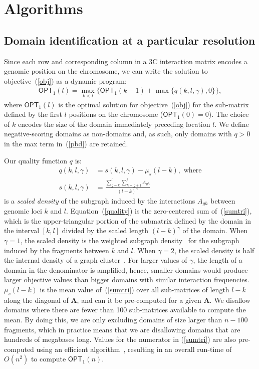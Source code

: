 \documentclass[12pt]{cmuthesis}
\begin{document}
\section{Algorithms}



  \subsection{Domain identification at a particular resolution}
  \label{singleres}
  Since each row and corresponding column in a 3C interaction matrix encodes a genomic position on the chromosome, we can write the solution to objective~(\ref{obj}) as a dynamic program:
  \begin{align}
    \label{pbd}
    \textsf{OPT}_1(l) = \max_{k<l}\{\textsf{OPT}_1(k-1) + \max\{q(k,l,\gamma),0\}\},
  \end{align}
  where $\textsf{OPT}_1(l)$ is the optimal solution for objective~(\ref{obj}) for the sub-matrix defined by the first $l$ positions on the chromosome ($\textsf{OPT}_1(0) = 0$). The choice of $k$ encodes the size of the domain immediately preceding location $l$. We define negative-scoring domains as non-domains and, as such, only domains with $q > 0$ in the max term in~(\ref{pbd}) are retained.

  Our quality function $q$ is:
  \begin{align}
    \label{quality} q(k,l,\gamma) &= s(k,l,\gamma)-\mu_s(l-k),\mbox{ where}\\
    \label{sumtri} s(k,l,\gamma) &= \frac{\sum_{g=k}^l \sum_{h=g+1}^l A_{gh}}{(l-k)^\gamma}
  \end{align}
  is a \emph{scaled density} of the subgraph induced by the interactions $A_{gh}$ between genomic loci $k$ and $l$. Equation~(\ref{quality}) is the zero-centered sum of~(\ref{sumtri}), which is the upper-triangular portion of the submatrix defined by the domain in the interval $[k,l]$ divided by the scaled length $(l-k)^{\gamma}$ of the domain. When $\gamma=1$,  the scaled density is the weighted subgraph density~\cite{goldberg1984finding} for the subgraph induced by the fragments between $k$ and $l$. When $\gamma=2$, the scaled density is half the internal density of a graph cluster~\cite{Schaeffer2007}. For larger values of $\gamma$, the length of a domain in the denominator is amplified, hence, smaller domains would produce larger objective values than bigger domains with similar interaction frequencies. $\mu_s(l-k)$ is the mean value of~(\ref{sumtri}) over all sub-matrices of length $l-k$ along the diagonal of $\mathbf{A}$, and can it be pre-computed for a given $\mathbf{A}$. We disallow  domains where there are fewer than 100 sub-matrices available to compute the mean. By doing this, we are only excluding domains of size larger than $n-100$ fragments, which in practice means that we are disallowing domains that are  hundreds of megabases long.  Values for the numerator in (\ref{sumtri}) are also pre-computed using an efficient algorithm~\cite{Filippova2012}, resulting in an overall run-time of $O(n^2)$ to compute $\textsf{OPT}_1(n)$.
\end{document}
